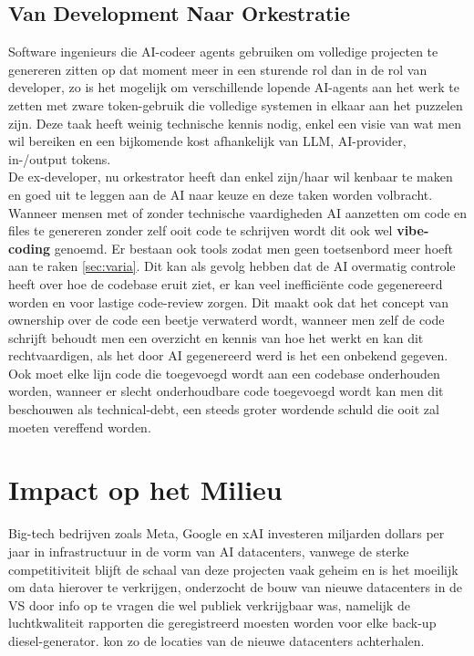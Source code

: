 \subsection{Van Development Naar Orkestratie}
\label{ssec:vandevelopmentnaarorkestratie}
Software ingenieurs die AI-codeer agents gebruiken om volledige projecten te genereren zitten op dat moment meer in een sturende rol dan in de rol van developer, zo is het mogelijk om verschillende lopende AI-agents aan het werk te zetten met zware token-gebruik die volledige systemen in elkaar aan het puzzelen zijn. Deze taak heeft weinig technische kennis nodig, enkel een visie van wat men wil bereiken en een bijkomende kost afhankelijk van LLM, AI-provider, in-/output tokens. \\

De ex-developer, nu orkestrator heeft dan enkel zijn/haar wil kenbaar te maken en goed uit te leggen aan de AI naar keuze en deze taken worden volbracht. Wanneer mensen met of zonder technische vaardigheden AI aanzetten om code en files te genereren zonder zelf ooit code te schrijven wordt dit ook wel \textbf{vibe-coding} genoemd. Er bestaan ook tools zodat men geen toetsenbord meer hoeft aan te raken \ref{sec:varia}. Dit kan als gevolg hebben dat de AI overmatig controle heeft over hoe de codebase eruit ziet, er kan veel inefficiënte code gegenereerd worden en voor lastige code-review zorgen. Dit maakt ook dat het concept van ownership over de code een beetje verwaterd wordt, wanneer men zelf de code schrijft behoudt men een overzicht en kennis van hoe het werkt en kan dit rechtvaardigen, als het door AI gegenereerd werd is het een onbekend gegeven. Ook moet elke lijn code die toegevoegd wordt aan een codebase onderhouden worden, wanneer er slecht onderhoudbare code toegevoegd wordt kan men dit beschouwen als technical-debt, een steeds groter wordende schuld die ooit zal moeten vereffend worden.

\section{Impact op het Milieu}
\label{sec:impactophetmilieu}

Big-tech bedrijven zoals Meta, Google en xAI investeren miljarden dollars per jaar in infrastructuur in de vorm van AI datacenters, vanwege de sterke competitiviteit blijft de schaal van deze projecten vaak geheim en is het moeilijk om data hierover te verkrijgen, \textcite{BusinessInsider2025} onderzocht de bouw van nieuwe datacenters in de VS door info op te vragen die wel publiek verkrijgbaar was, namelijk de luchtkwaliteit rapporten die geregistreerd moesten worden voor elke back-up diesel-generator. \textcite{BusinessInsider2025} kon zo de locaties van de nieuwe datacenters achterhalen. \\

